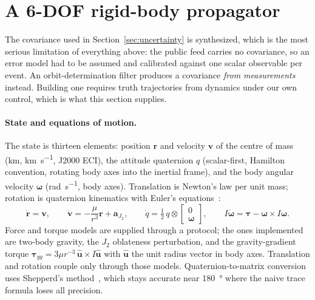 \documentclass[11pt]{article}
\begin{document}
\section{A 6-DOF rigid-body propagator}\label{sec:flight}

The covariance used in Section~\ref{sec:uncertainty} is synthesized, which
is the most serious limitation of everything above: the public feed carries
no covariance, so an error model had to be assumed and calibrated against
one scalar observable per event. An orbit-determination filter produces a
covariance \emph{from measurements} instead. Building one requires truth
trajectories from dynamics under our own control, which is what this section
supplies.

\paragraph{State and equations of motion.}
The state is thirteen elements: position $\mathbf{r}$ and velocity
$\mathbf{v}$ of the centre of mass (\si{\kilo\meter},
\si{\kilo\meter\per\second}, J2000 ECI), the attitude quaternion $q$
(scalar-first, Hamilton convention, rotating body axes into the inertial
frame), and the body angular velocity $\boldsymbol\omega$
(\si{\radian\per\second}, body axes). Translation is Newton's law per unit
mass; rotation is quaternion kinematics with Euler's equations~\cite{schaub}:
\begin{equation}
\dot{\mathbf{r}} = \mathbf{v}, \qquad
\dot{\mathbf{v}} = -\frac{\mu}{r^3}\mathbf{r} + \mathbf{a}_{J_2}, \qquad
\dot q = \tfrac12 \, q \otimes
  \begin{bmatrix} 0 \\ \boldsymbol\omega \end{bmatrix}, \qquad
I\dot{\boldsymbol\omega} = \boldsymbol\tau
  - \boldsymbol\omega \times I\boldsymbol\omega .
\label{eq:6dof}
\end{equation}
Force and torque models are supplied through a protocol; the ones
implemented are two-body gravity, the $J_2$ oblateness perturbation, and the
gravity-gradient torque
$\boldsymbol\tau_{gg} = 3\mu r^{-3}\,\hat{\mathbf u} \times I\hat{\mathbf u}$
with $\hat{\mathbf u}$ the unit radius vector in body axes. Translation and
rotation couple only through those models. Quaternion-to-matrix conversion
uses Shepperd's method~\cite{shepperd}, which stays accurate near
\SI{180}{\degree} where the naive trace formula loses all precision.
\end{document}
